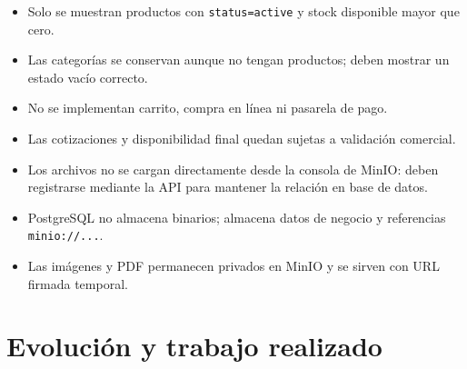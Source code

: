 \documentclass[11pt,a4paper]{article}
\newcommand{\code}[1]{\nolinkurl{#1}}
\begin{document}
\begin{itemize}
  \item Solo se muestran productos con \code{status=active} y stock disponible mayor que cero.
  \item Las categorías se conservan aunque no tengan productos; deben mostrar un estado vacío correcto.
  \item No se implementan carrito, compra en línea ni pasarela de pago.
  \item Las cotizaciones y disponibilidad final quedan sujetas a validación comercial.
  \item Los archivos no se cargan directamente desde la consola de MinIO: deben registrarse mediante la API para mantener la relación en base de datos.
  \item PostgreSQL no almacena binarios; almacena datos de negocio y referencias \code{minio://...}.
  \item Las imágenes y PDF permanecen privados en MinIO y se sirven con URL firmada temporal.
\end{itemize}

\section{Evolución y trabajo realizado}
\end{document}

